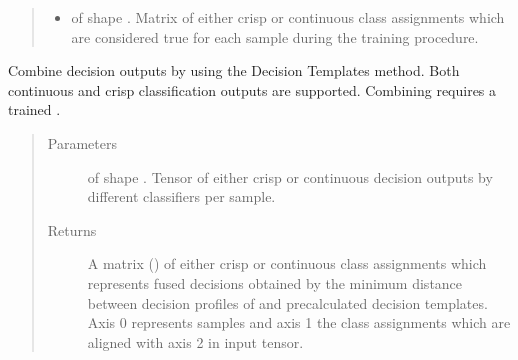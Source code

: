 \documentclass[letterpaper,10pt,english]{sphinxmanual}
\begin{document}
\begin{fulllineitems}
\begin{fulllineitems}
\begin{quote}
\begin{description}
\begin{itemize}
\item {} 
\sphinxAtStartPar
{} \textendash{}  of shape .
Matrix of either crisp or continuous class assignments which are considered true for each sample during
the training procedure.

\end{itemize}

\end{description}\end{quote}

\end{fulllineitems}


\begin{fulllineitems}
\label{\detokenize{pusion.core.decision_templates_combiner:pusion.core.decision_templates_combiner.DecisionTemplatesCombiner.combine}}
\sphinxAtStartPar
Combine decision outputs by using the Decision Templates method.
Both continuous and crisp classification outputs are supported. Combining requires a trained
{\hyperref[\detokenize{pusion.core.decision_templates_combiner:pusion.core.decision_templates_combiner.DecisionTemplatesCombiner}]{}}.
\begin{quote}\begin{description}
\item[{Parameters}] \leavevmode
\sphinxAtStartPar
{} \textendash{}  of shape .
Tensor of either crisp or continuous decision outputs by different classifiers per sample.

\item[{Returns}] \leavevmode
\sphinxAtStartPar
A matrix () of either crisp or continuous class assignments which represents fused
decisions obtained by the minimum distance between decision profiles of  and
precalculated decision templates. Axis 0 represents samples and axis 1 the class assignments which
are aligned with axis 2 in  input tensor.

\end{description}\end{quote}

\end{fulllineitems}


\end{fulllineitems}
\end{document}

